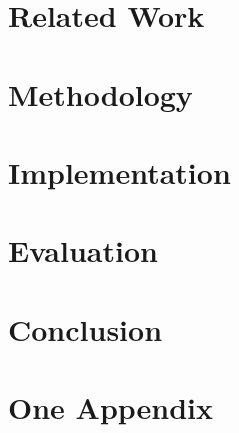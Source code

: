 \documentclass[12pt,a4paper,oneside]{book}
\begin{document}
\chapter{Related Work}\label{chapter:relatedWork}


\chapter{Methodology}\label{chapter:methodology}


\chapter{Implementation}\label{chapter:implementation}


\chapter{Evaluation}\label{chapter:evaluation}


\chapter{Conclusion}\label{chapter:conclusion}





\appendix 
{}

\chapter{One Appendix}\label{chapter:oneappendix}
\end{document}
